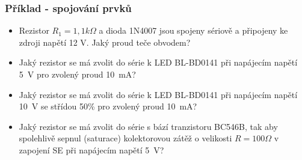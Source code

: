 \documentclass{beamer}
\begin{document}
  \begin{frame}
    \frametitle{Příklad - spojování prvků}
    
    \begin{itemize}
      \item Rezistor $R_1 = 1,1 k\Omega$ a dioda 1N4007  jsou spojeny 
      sériově a připojeny ke zdroji napětí 12 V. Jaký proud teče obvodem?
      \item Jaký rezistor se má zvolit do série k LED BL-BD0141 při napájecím
      napětí 5~V pro zvolený proud 10~mA?
      \item Jaký rezistor se má zvolit do série k LED BL-BD0141 při napájecím
      napětí 10~V se střídou 50\% pro zvolený proud 10~mA?
      \item Jaký rezistor se má zvolit do série s bází tranzistoru BC546B, tak
      aby spolehlivě sepnul (saturace) kolektorovou zátěž o velikosti 
      $R = 100\Omega$ v zapojení SE při napájecím napětí 5~V?
    \end{itemize}
    
  \end{frame}
\end{document}
